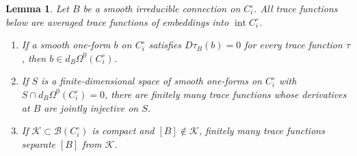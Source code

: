 \documentclass[11pt]{amsart}
\newtheorem{lemma}[theorem]{Lemma}
\theoremstyle{definition}
\theoremstyle{remark}
\theoremstyle{plain}
\numberwithin{equation}{section}
\newcommand{\cB}{\mathcal{B}}
\begin{document}
\begin{lemma}\label{lem:app-detection}
Let $B$ be a smooth irreducible connection on $C_i^\circ$. All trace functions below are averaged
trace functions of embeddings into $\operatorname{int}C_i^\circ$.
\begin{enumerate}[label=(\roman*)]
\item If a smooth one-form $b$ on $C_i^\circ$ satisfies $D\tau_B(b)=0$ for every trace function
  $\tau$, then $b\in d_B\Omega^0(C_i^\circ)$.
\item If $S$ is a finite-dimensional space of smooth one-forms on $C_i^\circ$ with
  $S\cap d_B\Omega^0(C_i^\circ)=0$, there are finitely many trace functions whose derivatives at
  $B$ are jointly injective on $S$.
\item If $\mathcal K\subset\cB(C_i^\circ)$ is compact and $[B]\notin\mathcal K$, finitely many
  trace functions separate $[B]$ from $\mathcal K$.
\end{enumerate}
\end{lemma}
\end{document}
